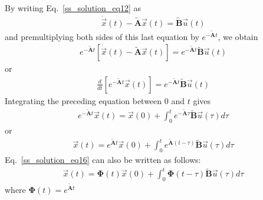 \documentclass[12pt,a4paper,oneside]{book}
\begin{document}
\begin{onehalfspace}
By writing Eq.~\eqref{ss_solution_eq12} as
\begin{equation}\label{ss_solution_eq13}
	\begin{aligned}
		\dot{\vec{x}}(t)-\tilde{\mathbf{A}}\vec{x}(t) = \tilde{\mathbf{B}}\vec{u}(t)
	\end{aligned}
\end{equation}
and premultiplying both sides of this last equation by 
$e^{-\tilde{\mathbf{A}}t}$, we obtain 
\begin{equation}\label{ss_solution_eq14}
	\begin{aligned}
		e^{-\tilde{\mathbf{A}}t} \left[ 
		\dot{\vec{x}}(t)-\tilde{\mathbf{A}}\vec{x}(t) \right] = 
		e^{-\tilde{\mathbf{A}}t} \tilde{\mathbf{B}}\vec{u}(t)
	\end{aligned}
\end{equation}
or
\begin{equation}\label{ss_solution_eq14b}
	\begin{aligned}
 \frac{d}{dt}\left[ e^{-\tilde{\mathbf{A}}t} \vec{x}(t)\right] = 
 e^{-\tilde{\mathbf{A}}t} \tilde{\mathbf{B}}\vec{u}(t)
	\end{aligned}
\end{equation}
Integrating the preceding equation between $0$ and $t$ gives
\begin{equation}\label{ss_solution_eq15}
	\begin{aligned}
		e^{-\tilde{\mathbf{A}}t} \vec{x}(t) = \vec{x}(0) + 
		\int_{0}^{t}e^{-\tilde{\mathbf{A}}\tau}\tilde{\mathbf{B}}\vec{u}(\tau)d\tau
	\end{aligned}
\end{equation}
or 
\begin{equation}\label{ss_solution_eq16}
	\begin{aligned}
		\vec{x}(t) = e^{\tilde{\mathbf{A}}t} \vec{x}(0) + 
		\int_{0}^{t}e^{\tilde{\mathbf{A}}(t-\tau)}\tilde{\mathbf{B}}\vec{u}(\tau)d\tau
	\end{aligned}
\end{equation}
Eq.~\eqref{ss_solution_eq16} can also be written as follows:
\begin{equation}\label{ss_solution_eq17}
	\begin{aligned}
		\vec{x}(t) = \mathbf{\Phi}(t) \vec{x}(0) + \int_{0}^{t}\mathbf{\Phi}(t-\tau)\tilde{\mathbf{B}}\vec{u}(\tau)d\tau
	\end{aligned}
\end{equation}
where $\mathbf{\Phi}(t) = e^{\tilde{\mathbf{A}}t}$


\end{onehalfspace}
\end{document}
